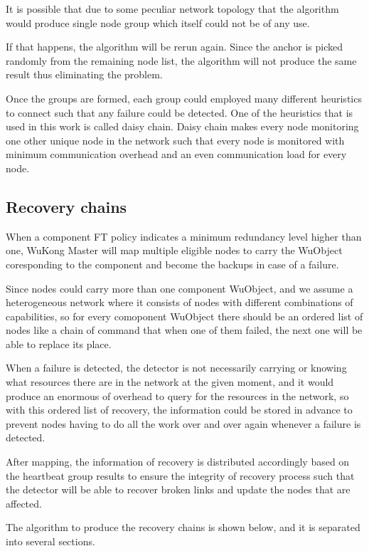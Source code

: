 It is possible that due to some peculiar network topology that the
algorithm would produce single node group which itself could not be of any use.

If that happens, the algorithm will be rerun again. Since the anchor is picked
randomly from the remaining node list, the algorithm will not produce the same
result thus eliminating the problem.

Once the groups are formed, each group could employed many different heuristics
to connect such that any failure could be detected. One of the heuristics that
is used in this work is called daisy chain. Daisy chain makes every node
monitoring one other unique node in the network such that every node is
monitored with minimum communication overhead and an even communication load
for every node.

\subsection{Recovery chains}

When a component FT policy indicates a minimum redundancy level higher than
one, WuKong Master will map multiple eligible nodes to carry the WuObject
coresponding to the component and become the backups in case of a failure.

Since nodes could carry more than one component WuObject, and we assume
a heterogeneous network where it consists of nodes with different combinations
of capabilities, so for every comoponent WuObject there should be an ordered
list of nodes like a chain of command that when one of them failed, the next
one will be able to replace its place.

When a failure is detected, the detector is not necessarily carrying or knowing
what resources there are in the network at the given moment, and it would
produce an enormous of overhead to query for the resources in the network, so
with this ordered list of recovery, the information could be stored in advance
to prevent nodes having to do all the work over and over again whenever
a failure is detected. 

After mapping, the information of recovery is distributed accordingly based on
the heartbeat group results to ensure the integrity of recovery process such
that the detector will be able to recover broken links and update the nodes
that are affected.

The algorithm to produce the recovery chains is shown below, and it is
separated into several sections.

